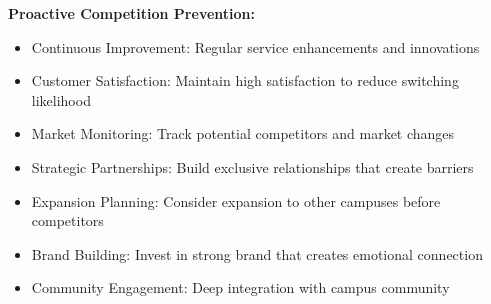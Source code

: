 \textbf{Proactive Competition Prevention:}
\begin{itemize}[leftmargin=2em]
    \item Continuous Improvement: Regular service enhancements and innovations
    \item Customer Satisfaction: Maintain high satisfaction to reduce switching likelihood
    \item Market Monitoring: Track potential competitors and market changes
    \item Strategic Partnerships: Build exclusive relationships that create barriers
    \item Expansion Planning: Consider expansion to other campuses before competitors
    \item Brand Building: Invest in strong brand that creates emotional connection
    \item Community Engagement: Deep integration with campus community
\end{itemize}

\vspace{1em}

